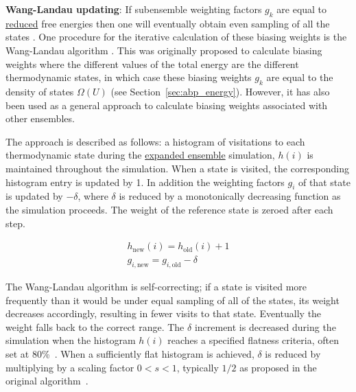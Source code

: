 \documentclass[9pt,review]{livecoms}
\begin{document}
\textbf{Wang-Landau updating}:
If subensemble weighting factors $g_k$ are equal to \hyperlink{ref:reduced} {reduced} free energies then one will eventually obtain even sampling of all the states
\cite{lyubartsev:jcp:1992:expanded-ensembles}.  One procedure for the
iterative calculation of these biasing weights is the Wang-Landau
algorithm \cite{wang-landau:prl:2001:wang-landau}. This was originally proposed to calculate biasing weights where the different values of the total energy are the different thermodynamic states, in which case these biasing weights $g_k$ are equal to the density of states $\Omega(U)$ (see Section~\ref{sec:abp_energy}).  However, it has also been used as a general approach to calculate biasing weights associated with other ensembles.

The approach is described as follows: a histogram of visitations to each thermodynamic state
during the \hyperlink{ref:ExpEns} {expanded ensemble} simulation, $h(i)$ is maintained
throughout the simulation.  When a state is visited, the corresponding
histogram entry is updated by 1.  In addition the weighting factors $g_i$ of that state is updated by $-\delta$, where $\delta$ is reduced by a monotonically decreasing function as the simulation proceeds.  The
weight of the reference state is zeroed after each step.

\begin{eqnarray}
h_{\mathrm{new}}(i) = h_{\mathrm{old}}(i) + 1 \\
g_{i,\mathrm{new}} = g_{i,\mathrm{old}} - \delta
\label{eq:wang-landau}
\end{eqnarray}

The Wang-Landau algorithm is self-correcting; if a state is visited more frequently than it would be under equal sampling of all of the states, its weight decreases accordingly, resulting in fewer visits to that state.  Eventually the weight falls back to the correct range.  The $\delta$ increment is decreased during the simulation when the histogram $h(i)$ reaches a specified flatness criteria, often set at 80\%~\cite{wang-landau:prl:2001:wang-landau}.  When a sufficiently flat histogram is achieved, $\delta$ is reduced by multiplying by a scaling factor $0<s<1$, typically $1/2$ as proposed in the original algorithm~\cite{wang-landau:prl:2001:wang-landau}.
\end{document}
